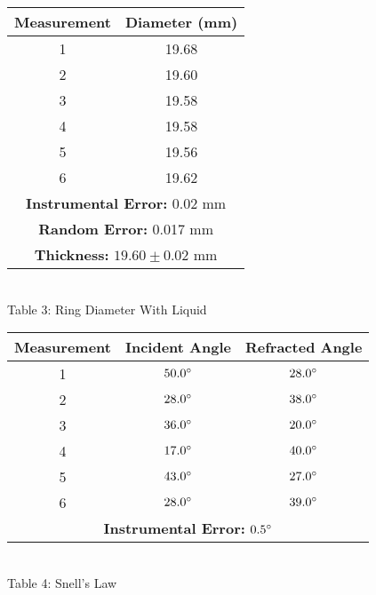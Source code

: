 \begin{center}
\begin{minipage}{.5\linewidth}
        \vspace{10mm}
    \end{minipage} 
    \begin{tabular}{|c|c|}
        \hline
        \textbf{Measurement} & \textbf{Diameter (mm)} \\ \hline
        1 & 19.68 \\ 
        2 & 19.60 \\ 
        3 & 19.58 \\ 
        4 & 19.58 \\ 
        5 & 19.56 \\ 
        6 & 19.62 \\ \hline
        \multicolumn{2}{|c|}{\textbf{Instrumental Error:} 0.02 mm} \\
        \multicolumn{2}{|c|}{\textbf{Random Error:} 0.017 mm} \\
        \multicolumn{2}{|c|}{\textbf{Thickness:} $19.60\pm0.02$ mm} \\ 
        \hline
    \end{tabular}
    \vspace{3mm}
    \\Table 3: Ring Diameter With Liquid
    \begin{tabular}{|c|c c|}
    \hline
        \textbf{Measurement} & \textbf{Incident Angle} & \textbf{Refracted Angle} \\ \hline
        1 & $50.0\degree$ & $28.0\degree$ \\ 
        2 & $28.0\degree$ & $38.0\degree$ \\ 
        3 & $36.0\degree$ & $20.0\degree$ \\ 
        4 & $17.0\degree$ & $40.0\degree$ \\ 
        5 & $43.0\degree$ & $27.0\degree$ \\ 
        6 & $28.0\degree$ & $39.0\degree$ \\ \hline
        \multicolumn{3}{|c|}{\textbf{Instrumental Error:} $0.5\degree$} \\ \hline
    \end{tabular}
    \vspace{3mm}
    \\Table 4: Snell's Law
\end{center}
